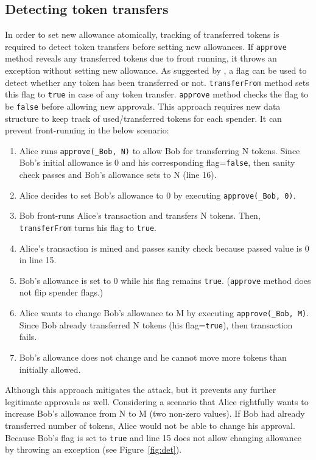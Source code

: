 \subsection{Detecting token transfers}
In order to set new allowance atomically, tracking of transferred tokens is required to detect token transfers before setting new allowances. If \texttt{approve} method reveals any transferred tokens due to front running, it throws an exception without setting new allowance. As suggested by \cite{Ref17}, a flag can be used to detect whether any token has been transferred or not. \texttt{transferFrom} method sets this flag to \texttt{true} in case of any token transfer. \texttt{approve} method checks the flag to be \texttt{false} before allowing new approvals. This approach requires new data structure to keep track of used/transferred tokens for each spender. It can prevent front-running in the below scenario:
\begin{enumerate}
	\item Alice runs \texttt{approve(\_Bob, N)} to allow Bob for transferring N tokens. Since Bob’s initial allowance is 0 and his corresponding flag=\texttt{false}, then sanity check passes and Bob’s allowance sets to N (line 16).
	\item Alice decides to set Bob’s allowance to 0 by executing \texttt{approve(\_Bob, 0)}.
	\item Bob front-runs Alice’s transaction and transfers N tokens. Then, \texttt{transferFrom} turns his flag to \texttt{true}.
	\item Alice’s transaction is mined and passes sanity check because passed value is 0 in line 15.
	\item Bob’s allowance is set to 0 while his flag remains \texttt{true}. (\texttt{approve} method does not flip spender flags.)
	\item Alice wants to change Bob’s allowance to M by executing \texttt{approve(\_Bob, M)}. Since Bob already transferred N tokens (his flag=\texttt{true}), then transaction fails.
	\item Bob’s allowance does not change and he cannot move more tokens than initially allowed.
\end{enumerate}
\noindent Although this approach mitigates the attack, but it prevents any further legitimate approvals as well. Considering a scenario that Alice rightfully wants to increase Bob’s allowance from N to M (two non-zero values). If Bob had already transferred number of tokens, Alice would not be able to change his approval. Because Bob's flag is set to \texttt{true} and line 15 does not allow changing allowance by throwing an exception (see Figure~\ref{fig:det}).
